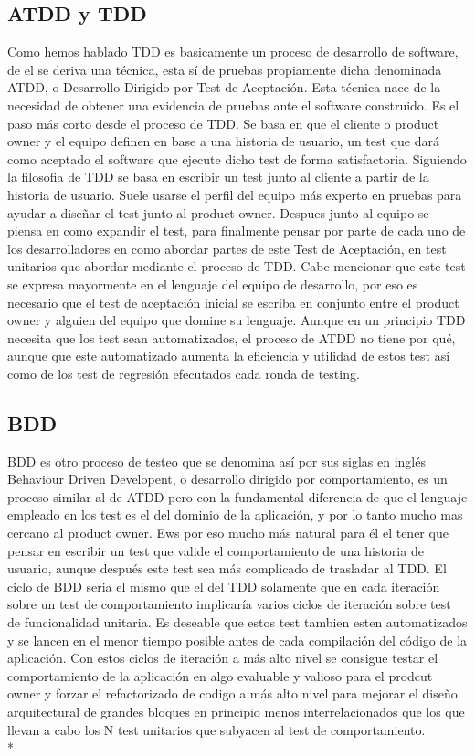 \documentclass[../pfc.tex]{subfiles}
\begin{document}
	
	\subsection{ATDD y TDD}
	
	Como hemos hablado TDD es basicamente un proceso de desarrollo de software, de el se deriva una técnica, esta sí de pruebas propiamente dicha denominada ATDD, o Desarrollo Dirigido por Test de Aceptación. Esta técnica nace de la necesidad de obtener una evidencia de pruebas ante el software construido. Es el paso más corto desde el proceso de TDD. Se basa en que el cliente o product owner y el equipo definen en base a una historia de usuario, un test que dará como aceptado el software que ejecute dicho test de forma satisfactoria. Siguiendo la filosofia de TDD se basa en escribir un test junto al cliente a partir de la historia de usuario. Suele usarse el perfil del equipo más experto en pruebas para ayudar a diseñar el test junto al product owner. Despues junto al equipo se piensa en como expandir el test, para finalmente pensar por parte de cada uno de los desarrolladores en como abordar partes de este Test de Aceptación, en test unitarios que abordar mediante el proceso de TDD. Cabe mencionar que este test se expresa mayormente en el lenguaje del equipo de desarrollo, por eso es necesario que el test de aceptación inicial se escriba en conjunto entre el product owner y alguien del equipo que domine su lenguaje. Aunque en un principio TDD necesita que los test sean automatixados, el proceso de ATDD no tiene por qué, aunque que este automatizado aumenta la eficiencia y utilidad de estos test así como de los test de regresión efecutados cada ronda de testing. 
		
	\subsection{BDD}
	
	BDD es otro proceso de testeo que se denomina así por sus siglas en inglés Behaviour Driven Developent, o desarrollo dirigido por comportamiento, es un proceso similar al de ATDD pero con la fundamental diferencia de que el lenguaje empleado en los test es el del dominio de la aplicación, y por lo tanto mucho mas cercano al product owner. Ews por eso mucho más natural para él el tener que pensar en escribir un test que valide el comportamiento de una historia de usuario, aunque después este test sea más complicado de trasladar al TDD. El ciclo de BDD seria el mismo que el del TDD solamente que en cada iteración sobre un test de comportamiento implicaría varios ciclos de iteración sobre test de funcionalidad unitaria. Es deseable que estos test tambien esten automatizados y se lancen en el menor tiempo posible antes de cada compilación del código de la aplicación. Con estos ciclos de iteración a más alto nivel se consigue testar el comportamiento de la aplicación en algo evaluable y valioso para el prodcut owner y forzar el refactorizado de codigo a más alto nivel para mejorar el diseño arquitectural de grandes bloques en principio menos interrelacionados que los que llevan a cabo los N test unitarios que subyacen al test de comportamiento.\\*
	
\end{document}
